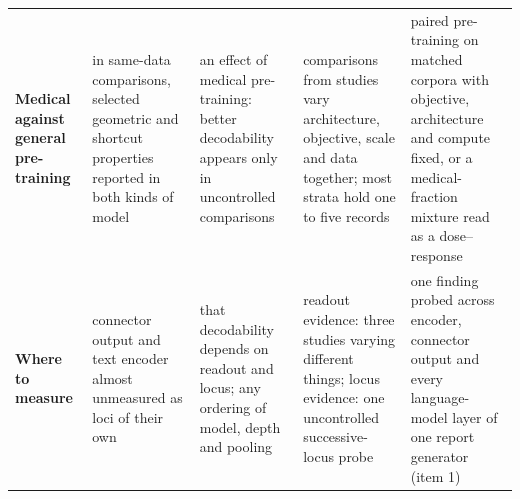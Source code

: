 \begin{table}[!tb]
\begin{tabular}{@{}L{2.45cm}L{3.3cm}L{3.2cm}L{3.2cm}L{3.2cm}@{}}
\addlinespace[2pt]
\textbf{Medical against general pre-training}  & in same-data comparisons, selected geometric and shortcut properties reported in both kinds of model & an effect of medical pre-training: better decodability appears only in uncontrolled comparisons & \Nmvgrec{} comparisons from \Nmvgstud{} studies vary architecture, objective, scale and data together; most strata hold one to five records & paired pre-training on matched corpora with objective, architecture and compute fixed, or a medical-fraction mixture read as a dose--response \\
\addlinespace[2pt]
\textbf{Where to measure}  & connector output and text encoder almost unmeasured as loci of their own & that decodability depends on readout and locus; any ordering of model, depth and pooling & readout evidence: three studies varying different things; locus evidence: one uncontrolled successive-locus probe & one finding probed across encoder, connector output and every language-model layer of one report generator (item 1) \\
\bottomrule
\end{tabular}
\end{table}
